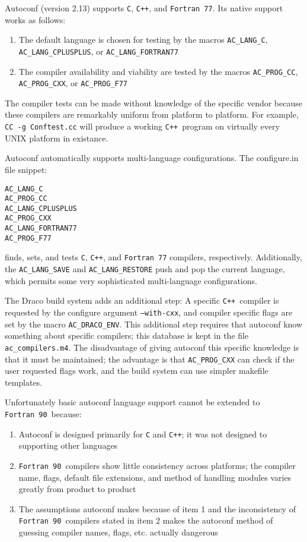 \documentclass[11pt]{nmemo}
\newcommand{\fninety}{\texttt{Fortran~90}}
\newcommand{\cpp}{\texttt{C++}}
\begin{document}
Autoconf (version 2.13) supports \texttt{C}, \cpp, and \texttt{Fortran
77}.  Its native support works as follows:
\begin{enumerate} 
\item The default language is chosen for testing by the macros
\texttt{AC\_LANG\_C}, \texttt{AC\_LANG\_CPLUSPLUS}, or
\texttt{AC\_LANG\_FORTRAN77} 
\item The compiler availability and viability are tested by
the macros \texttt{AC\_PROG\_CC}, \texttt{AC\_PROG\_CXX}, or
\texttt{AC\_PROG\_F77} 
\end{enumerate}
The compiler tests can be made without knowledge of the specific
vendor because these compilers are remarkably uniform from platform to
platform. For example, \texttt{CC -g Conftest.cc} will produce a
working \cpp\ program on virtually every UNIX platform in existance.

Autoconf automatically supports multi-language configurations.  The
configure.in file snippet:\\
\begin{verbatim}
AC_LANG_C
AC_PROG_CC
AC_LANG_CPLUSPLUS
AC_PROG_CXX
AC_LANG_FORTRAN77
AC_PROG_F77
\end{verbatim}
finds, sets, and tests \texttt{C}, \cpp, and \texttt{Fortran 77}
compilers, respectively.  Additionally, the \texttt{AC\_LANG\_SAVE}
and \texttt{AC\_LANG\_RESTORE} push and pop the current language,
which permits some very sophisticated multi-language configurations.

The Draco build system adds an additional step: A specific \cpp\
compiler is requested by the configure argument \texttt{--with-cxx},
and compiler specific flags are set by the macro
\texttt{AC\_DRACO\_ENV}.  This additional step requires that autoconf
know something about specific compilers; this database is kept in the
file \texttt{ac\_compilers.m4}.  The disadvantage of giving autoconf
this specific knowledge is that it must be maintained; the advantage
is that \texttt{AC\_PROG\_CXX} can check if the user requested flags
work, and the build system can use simpler makefile templates.

Unfortunately basic autoconf language support cannot be extended to
\fninety\ because:
\begin{enumerate}
\item Autoconf is designed primarily for \texttt{C} and \cpp; it was
not designed to supporting other languages
\item \fninety\ compilers show little consistency across platforms;
the compiler name, flags, default file extensions, and method of
handling modules varies greatly from product to product
\item The assumptions autoconf makes because of item 1 and the
inconsistency of \fninety\ compilers stated in item 2 makes the
autoconf method of guessing compiler names, flags, etc. actually
dangerous
\end{enumerate}
\end{document}
